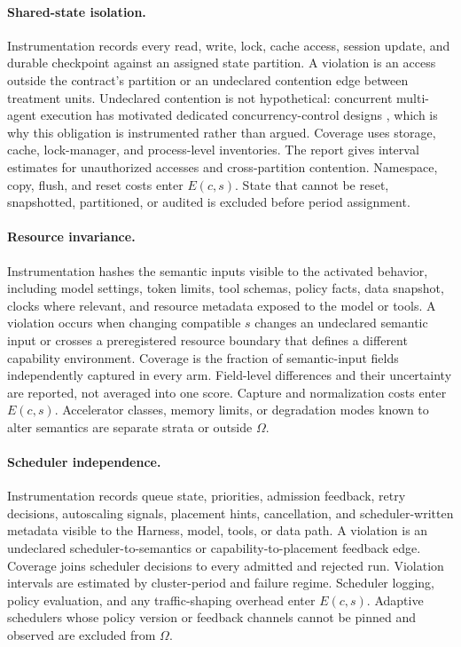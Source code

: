 \documentclass[11pt]{article}
\begin{document}
\paragraph{Shared-state isolation.}
Instrumentation records every read, write, lock, cache access, session update, and durable checkpoint against an assigned state partition. A violation is an access outside the contract's partition or an undeclared contention edge between treatment units. Undeclared contention is not hypothetical: concurrent multi-agent execution has motivated dedicated concurrency-control designs \cite{lyu2026coagent}, which is why this obligation is instrumented rather than argued. Coverage uses storage, cache, lock-manager, and process-level inventories. The report gives interval estimates for unauthorized accesses and cross-partition contention. Namespace, copy, flush, and reset costs enter $E(c,s)$. State that cannot be reset, snapshotted, partitioned, or audited is excluded before period assignment.

\paragraph{Resource invariance.}
Instrumentation hashes the semantic inputs visible to the activated behavior, including model settings, token limits, tool schemas, policy facts, data snapshot, clocks where relevant, and resource metadata exposed to the model or tools. A violation occurs when changing compatible $s$ changes an undeclared semantic input or crosses a preregistered resource boundary that defines a different capability environment. Coverage is the fraction of semantic-input fields independently captured in every arm. Field-level differences and their uncertainty are reported, not averaged into one score. Capture and normalization costs enter $E(c,s)$. Accelerator classes, memory limits, or degradation modes known to alter semantics are separate strata or outside $\Omega$.

\paragraph{Scheduler independence.}
Instrumentation records queue state, priorities, admission feedback, retry decisions, autoscaling signals, placement hints, cancellation, and scheduler-written metadata visible to the Harness, model, tools, or data path. A violation is an undeclared scheduler-to-semantics or capability-to-placement feedback edge. Coverage joins scheduler decisions to every admitted and rejected run. Violation intervals are estimated by cluster-period and failure regime. Scheduler logging, policy evaluation, and any traffic-shaping overhead enter $E(c,s)$. Adaptive schedulers whose policy version or feedback channels cannot be pinned and observed are excluded from $\Omega$.
\end{document}
